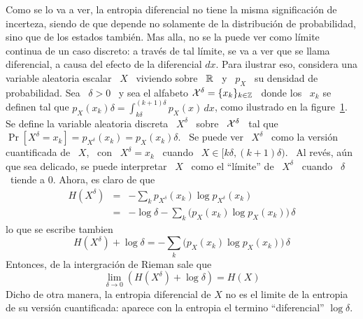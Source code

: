 Como se lo  va a ver, la entropia diferencial no  tiene la misma significaci\'on
de  incerteza,  siendo de  que  depende no  solamente  de  la distribuci\'on  de
probabilidad, sino que  de los estados tambi\'en.  Mas alla, no  se la puede ver
como l\'imite continua de un caso discreto:  a trav\'es de tal l\'imite, se va a
ver que se  llama diferencial, a causa del efecto de  la diferencial $dx$.  Para
ilustrar eso, considera una variable aleatoria  escalar \ $X$ \ viviendo sobre \
$\mathbb{R}$ \ y \  $p_X$ \ su densidad de probabilidad.  Sea \ $\delta  > 0$ \ y sea
el alfabeto $\mathcal{X}^\delta = \{ x_k \}_{k \in \mathbb{Z}}$ \ donde los \ $x_k$ se definen
tal que  $\displaystyle p_X(x_k) \delta = \int_{k  \delta}^{(k+1) \delta} p_X(x)
\, dx$, como ilustrado  en la figure~\ref{fig:SZ:CuantificacionX}.  Se define la
variable  aleatoria discreta  \ $X^\delta$  \ sobre  \ $\mathcal{X}^\delta$  \ tal  que \
$\Pr[X^\delta =  x_k] = p_{X^\delta}(x_k) =  p_X(x_k) \delta$. \ Se  puede ver \
$X^\delta$ \ como la versi\'on cuantificada de \ $X$, \ con \ $X^\delta = x_k$ \
cuando  \ $X \in  [k \delta  , (k+1)  \delta )$.   \ Al  rev\'es, a\'un  que sea
delicado, se  puede interpretar \ $X$ \  como el ``l\'imite'' de  \ $X^\delta$ \
cuando \ $\delta$ \ tiende a 0. Ahora, es claro de que
%
\begin{eqnarray*}
H(X^\delta) & = & - \sum_k p_{X^\delta}(x_k) \log p_{X^\delta}(x_k)\\[2.5mm]
%
& = & - \log \delta - \sum_k \Big( p_X(x_k) \log p_X(x_k) \Big) \, \delta
\end{eqnarray*}
%
lo que se escribe tambien
%
\[
H(X^\delta)  + \log  \delta =  - \sum_k  \Big( p_X(x_k)  \log p_X(x_k)  \Big) \,
\delta
\]
%
Entonces, de la intergraci\'on de Rieman sale que
%
\[
\lim_{\delta \to 0} \left( H(X^\delta) + \log \delta \right) = H(X)
\]
%
Dicho de  otra manera,  la entropia  diferencial de $X$  no es  el limite  de la
entropia  de su  versi\'on  cuantificada:  aparece con  la  entropia el  termino
``diferencial'' $\log \delta$.
%
\begin{figure}[h!]
\begin{center}  \end{center}
%
\label{fig:SZ:CuantificacionX}
\end{figure}
%

